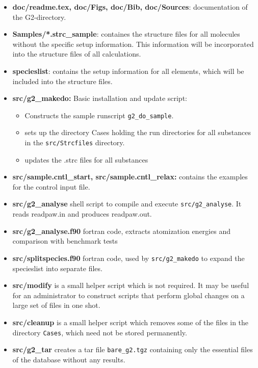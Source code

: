 \documentclass{book}
\begin{document}
\begin{itemize}
%
\item \textbf{doc/readme.tex, doc/Figs, doc/Bib, doc/Sources}: documentation of
  the G2-directory.  
%
\item \textbf{Samples/*.strc\_sample}: containes the structure files
  for all molecules without the specific setup information. This
  information will be incorporated into the structure files of all
  calculations.
%
\item \textbf{specieslist}: contains the setup information
  for all elements, which will be included into the structure files.
%
\item \textbf{src/g2\_makedo:} Basic installation and update script:
  \begin{itemize}
     \item Constructs the sample runscript \verb+g2_do_sample+. 
     \item sets up the directory Cases holding the run directories for all
        substances in the \verb|src/Strcfiles| directory.
     \item updates the .strc files for all substances
    \end{itemize}
%
\item \textbf{src/sample.cntl\_start, src/sample.cntl\_relax:} 
    contains the examples for the control input file. 
%
\item \textbf{src/g2\_analyse} shell script to compile and execute
\verb|src/g2_analyse|. It reads readpaw.in and produces readpaw.out.
%
\item \textbf{src/g2\_analyse.f90} fortran code, extracts atomization
  energies and comparison with benchmark tests
%
\item \textbf{src/splitspecies.f90} fortran code, used by
  \verb|src/g2_makedo| to expand the specieslist into separate files.
%
\item \textbf{src/modify} is a small helper script which is not
  required. It may be useful for an administrator to construct scripts
  that perform global changes on a large set of files in one shot.
%
\item \textbf{src/cleanup} is a small helper script which removes some
  of the files in the directory \verb|Cases|, which need not be stored
  permanently.
%
\item \textbf{src/g2\_tar} creates a tar file \verb|bare_g2.tgz|
  containing only the essential files of the database without any
  results.
\end{itemize}
\end{document}
